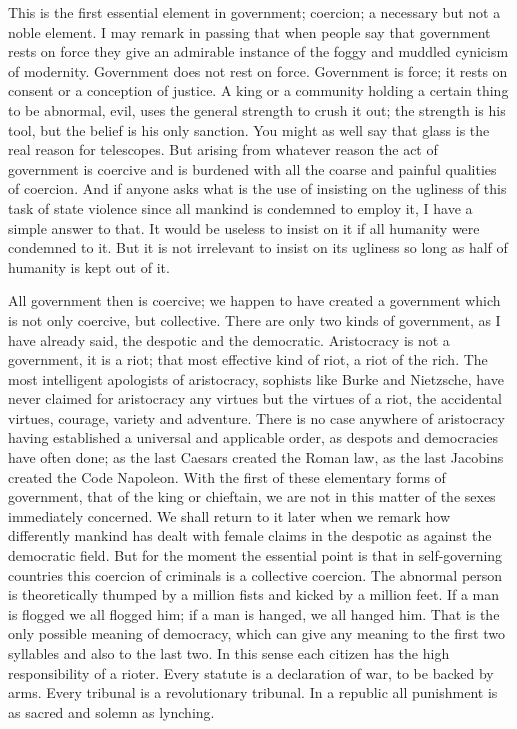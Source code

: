 \documentclass{book}
\begin{document}
This is the first essential element in government; coercion; a necessary but not a noble element. I may remark in passing that when people say that government rests on force they give an admirable instance of the foggy and muddled cynicism of modernity. Government does not rest on force. Government is force; it rests on consent or a conception of justice. A king or a community holding a certain thing to be abnormal, evil, uses the general strength to crush it out; the strength is his tool, but the belief is his only sanction. You might as well say that glass is the real reason for telescopes. But arising from whatever reason the act of government is coercive and is burdened with all the coarse and painful qualities of coercion. And if anyone asks what is the use of insisting on the ugliness of this task of state violence since all mankind is condemned to employ it, I have a simple answer to that. It would be useless to insist on it if all humanity were condemned to it. But it is not irrelevant to insist on its ugliness so long as half of humanity is kept out of it.

All government then is coercive; we happen to have created a government which is not only coercive, but collective. There are only two kinds of government, as I have already said, the despotic and the democratic. Aristocracy is not a government, it is a riot; that most effective kind of riot, a riot of the rich. The most intelligent apologists of aristocracy, sophists like Burke and Nietzsche, have never claimed for aristocracy any virtues but the virtues of a riot, the accidental virtues, courage, variety and adventure. There is no case anywhere of aristocracy having established a universal and applicable order, as despots and democracies have often done; as the last Caesars created the Roman law, as the last Jacobins created the Code Napoleon. With the first of these elementary forms of government, that of the king or chieftain, we are not in this matter of the sexes immediately concerned. We shall return to it later when we remark how differently mankind has dealt with female claims in the despotic as against the democratic field. But for the moment the essential point is that in self-governing countries this coercion of criminals is a collective coercion. The abnormal person is theoretically thumped by a million fists and kicked by a million feet. If a man is flogged we all flogged him; if a man is hanged, we all hanged him. That is the only possible meaning of democracy, which can give any meaning to the first two syllables and also to the last two. In this sense each citizen has the high responsibility of a rioter. Every statute is a declaration of war, to be backed by arms. Every tribunal is a revolutionary tribunal. In a republic all punishment is as sacred and solemn as lynching.
\end{document}
